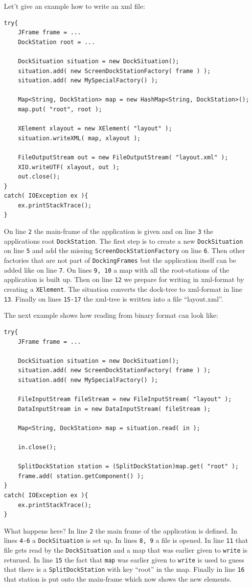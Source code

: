 \documentclass[a4paper,10pt]{article}
\newcommand{\src}[1]{\texttt{#1}}
\begin{document}
Let't give an example how to write an xml file:
\begin{lstlisting}
try{
	JFrame frame = ...
	DockStation root = ...

	DockSituation situation = new DockSituation();
	situation.add( new ScreenDockStationFactory( frame ) );
	situation.add( new MySpecialFactory() );

	Map<String, DockStation> map = new HashMap<String, DockStation>();
	map.put( "root", root );

	XElement xlayout = new XElement( "layout" );
	situation.writeXML( map, xlayout );

	FileOutputStream out = new FileOutputStream( "layout.xml" );
	XIO.writeUTF( xlayout, out );
	out.close();
}
catch( IOException ex ){
	ex.printStackTrace();
}
\end{lstlisting}
On line \src{2} the main-frame of the application is given and on line \src{3} the applications root \src{DockStation}. The first step is to create a new \src{DockSituation} on line \src{5} and add the missing \src{ScreenDockStationFactory} on line \src{6}. Then other factories that are not part of \src{DockingFrames} but the application itself can be added like on line \src{7}. On lines \src{9, 10} a map with all the root-stations of the application is built up. Then on line \src{12} we prepare for writing in xml-format by creating a \src{XElement}. The situation converts the dock-tree to xml-format in line \src{13}. Finally on lines \src{15-17} the xml-tree is written into a file ``layout.xml''.

The next example shows how reading from binary format can look like:
\begin{lstlisting}
try{
	JFrame frame = ...

	DockSituation situation = new DockSituation();
	situation.add( new ScreenDockStationFactory( frame ) );
	situation.add( new MySpecialFactory() );

	FileInputStream fileStream = new FileInputStream( "layout" );
	DataInputStream in = new DataInputStream( fileStream );

	Map<String, DockStation> map = situation.read( in );

	in.close();

	SplitDockStation station = (SplitDockStation)map.get( "root" );
	frame.add( station.getComponent() );
}
catch( IOException ex ){
	ex.printStackTrace();
}
\end{lstlisting}
What happens here? In line \src{2} the main frame of the application is defined. In lines \src{4-6} a \src{DockSituation} is set up. In lines \src{8, 9} a file is opened. In line \src{11} that file gets read by the \src{DockSituation} and a map that was earlier given to \src{write} is returned. In line \src{15} the fact that \src{map} was earlier given to \src{write} is used to guess that there is a \src{SplitDockStation} with key ``root'' in the map. Finally in line \src{16} that station is put onto the main-frame which now shows the new elements.
\end{document}
